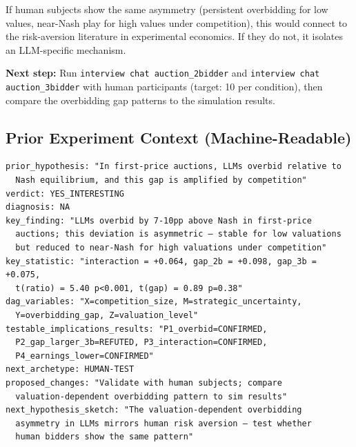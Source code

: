 \documentclass[11pt]{article}
\begin{document}
\noindent If human subjects show the same asymmetry (persistent overbidding for low values, near-Nash play for high values under competition), this would connect to the risk-aversion literature in experimental economics. If they do not, it isolates an LLM-specific mechanism.

\textbf{Next step:} Run \texttt{interview chat auction\_2bidder} and \texttt{interview chat auction\_3bidder} with human participants (target: 10 per condition), then compare the overbidding gap patterns to the simulation results.

\subsection*{Prior Experiment Context (Machine-Readable)}
\begin{verbatim}
prior_hypothesis: "In first-price auctions, LLMs overbid relative to
  Nash equilibrium, and this gap is amplified by competition"
verdict: YES_INTERESTING
diagnosis: NA
key_finding: "LLMs overbid by 7-10pp above Nash in first-price
  auctions; this deviation is asymmetric — stable for low valuations
  but reduced to near-Nash for high valuations under competition"
key_statistic: "interaction = +0.064, gap_2b = +0.098, gap_3b = +0.075,
  t(ratio) = 5.40 p<0.001, t(gap) = 0.89 p=0.38"
dag_variables: "X=competition_size, M=strategic_uncertainty,
  Y=overbidding_gap, Z=valuation_level"
testable_implications_results: "P1_overbid=CONFIRMED,
  P2_gap_larger_3b=REFUTED, P3_interaction=CONFIRMED,
  P4_earnings_lower=CONFIRMED"
next_archetype: HUMAN-TEST
proposed_changes: "Validate with human subjects; compare
  valuation-dependent overbidding pattern to sim results"
next_hypothesis_sketch: "The valuation-dependent overbidding
  asymmetry in LLMs mirrors human risk aversion — test whether
  human bidders show the same pattern"
\end{verbatim}
\end{document}
